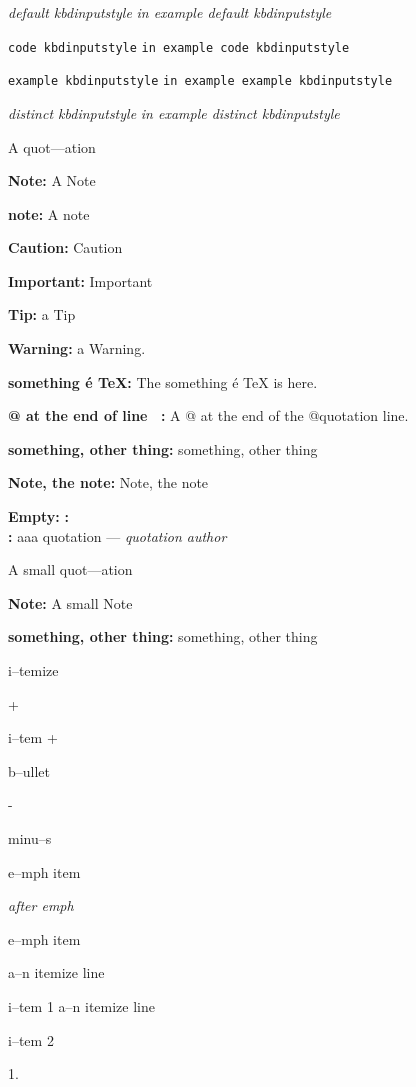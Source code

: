 \documentclass{book}
\begin{document}
{\ttfamily\textsl{default kbdinputstyle}}
{\ttfamily\textsl{in example default kbdinputstyle}}

\texttt{code kbdinputstyle}
\texttt{in example code kbdinputstyle}

\texttt{example kbdinputstyle}
\texttt{in example example kbdinputstyle}

{\ttfamily\textsl{distinct kbdinputstyle}}
{\ttfamily\textsl{in example distinct kbdinputstyle}}

A quot---ation

\textbf{Note:} A Note

\textbf{note:} A note

\textbf{Caution:} Caution

\textbf{Important:} Important

\textbf{Tip:} a Tip

\textbf{Warning:} a Warning.

\textbf{something \'{e} \TeX{}:} The something \'{e} \TeX{} is here.

\textbf{@ at the end of line \ {}:} A @ at the end of the @quotation line.

\textbf{something, other thing:} something, other thing

\textbf{Note, the note:} Note, the note


\textbf{Empty:} 
\textbf{:} 
\textbf{\leavevmode{}\\:} 
aaa quotation
--- \emph{quotation author}

A small quot---ation

\textbf{Note:} A small Note

\textbf{something, other thing:} something, other thing

\textbullet{} 

i--temize

+ 

i--tem +

\textbullet{} 

b--ullet

- 

minu--s

\emph{} 

e--mph item

\emph{after emph} 

e--mph item

\textbullet{} a--n itemize line 

i--tem 1
\textbullet{} a--n itemize line 

i--tem 2

1. 
\end{document}
